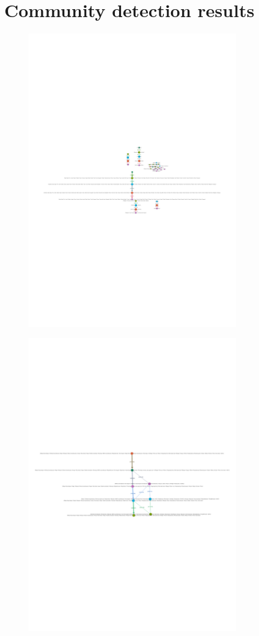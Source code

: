\chapter{Community detection results}

\begin{figure}[H]
	\centering
	\includegraphics[width=0.8\textwidth]{images/LCountry.pdf}
	\caption{}
	\label{fig:appendix-LCountry}
\end{figure}



\begin{figure}[H]
	\centering
	\includegraphics[width=0.8\textwidth]{images/LTag.pdf}
	\caption{}
	\label{fig:appendix-LTag}
\end{figure}